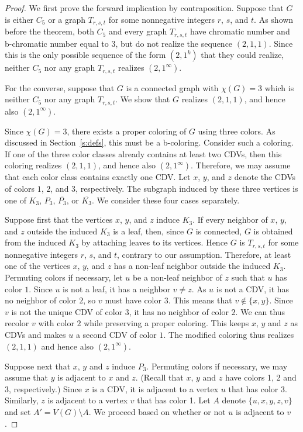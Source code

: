 \documentclass{article}
\theoremstyle{definition}
\begin{document}
\begin{proof}
We first prove the forward implication by contraposition. Suppose that $G$ is either $C_5$ or a graph $T_{r,s,t}$ for some nonnegative integers $r$, $s$, and $t$. As shown before the theorem, both $C_5$ and every graph $T_{r,s,t}$ have chromatic number and b-chromatic number equal to $3$, but do not realize the sequence $(2,1,1)$. Since this is the only possible sequence of the form $(2,1^k)$ that they could realize, neither $C_5$ nor any graph $T_{r,s,t}$ realizes $(2,1^\infty)$.

For the converse, suppose that $G$ is a connected graph with $\chi(G)=3$ which is neither $C_5$ nor any graph $T_{r,s,t}$. We show that $G$ realizes $(2,1,1)$, and hence also $(2,1^\infty)$.

Since $\chi(G)=3$, there exists a proper coloring of $G$ using three colors.
As discussed in Section~\ref{s:defs}, this must be a b-coloring.
Consider such a coloring.
If one of the three color classes already contains at least two CDVs, then this coloring realizes $(2,1,1)$, and hence also $(2,1^\infty)$. Therefore, we may assume that each color class contains exactly one CDV. Let $x$, $y$, and $z$ denote the CDVs of colors $1$, $2$, and $3$, respectively. The subgraph induced by these three vertices is one of $K_3$, $P_3$, $\overline{P_3}$, or $\overline{K_3}$. We consider these four cases separately.

\smallskip

Suppose first that the vertices $x$, $y$, and $z$ induce $K_3$. If every neighbor of $x$, $y$, and $z$ outside the induced $K_3$ is a leaf, then, since $G$ is connected, $G$ is obtained from the induced $K_3$ by attaching leaves to its vertices. Hence $G$ is $T_{r,s,t}$ for some nonnegative integers $r$, $s$, and $t$, contrary to our assumption. 
Therefore, at least one of the vertices $x$, $y$, and $z$ has a non-leaf neighbor outside the induced $K_3$. 
Permuting colors if necessary,
let $u$ be a non-leaf neighbor of $z$ such that $u$ has color $1$. 
Since $u$ is not a leaf, it has a neighbor $v\neq z$.
As $u$ is not a CDV, it has no neighbor of color $2$, so
$v$ must
have color $3$.
This means that $v\not\in\{x,y\}$.
Since $v$ is not the 
unique
CDV of color $3$, it has no neighbor of color $2$.
We can thus recolor $v$ with color $2$ while preserving a proper coloring.
This keeps $x$, $y$ and $z$ as CDVs and makes $u$ a second CDV of color $1$.
The modified coloring thus realizes $(2,1,1)$ and hence also $(2,1^\infty)$.

\smallskip
Suppose next that $x$, $y$ and $z$ induce $P_3$.
Permuting colors if necessary, we may assume that $y$ is adjacent to $x$ and $z$.
(Recall that $x$, $y$ and $z$ have colors 1, 2 and 3, respectively.)
Since $x$ is a CDV, it is adjacent to a vertex $u$ that has color 3.
Similarly, $z$ is adjacent to a vertex $v$ that has color 1.
Let $A$ denote $\{u,x,y,z,v\}$ and set $A'=V(G)\setminus A$.
We proceed based on whether or not $u$ is adjacent to $v$.


\end{proof}
\end{document}
